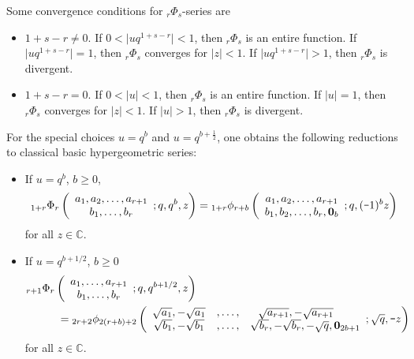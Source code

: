 \documentclass[12pt]{article}
\newcommand{\minus}{\textup{\texttt{-}}}
\newcommand{\C}{\mathbb{C}}
\begin{document}
Some convergence conditions for $_{r}\Phi_{s}$-series are
\begin{itemize}
    \item $1+s-r\neq0$. If $0<\vert uq^{1+s-r}\vert<1$, then ${}_{r}\Phi_{s}$ is an entire function. If $\vert uq^{1+s-r}\vert=1$, then ${}_{r}\Phi_{s}$ converges for $\vert z\vert<1$. If $\vert uq^{1+s-r}\vert>1$, then ${}_{r}\Phi_{s}$ is divergent.
    \item $1+s-r=0$. If $0<\vert u\vert<1$, then ${}_{r}\Phi_{s}$ is an entire function. If $\vert u\vert=1$, then ${}_{r}\Phi_{s}$ converges for $\vert z\vert<1$. If $\vert u\vert>1$, then ${}_{r}\Phi_{s}$ is divergent.
\end{itemize}
For the special choices \(u=q^b\) and \(u=q^{b+\frac12}\), one obtains the following reductions to classical basic hypergeometric series:
\begin{itemize}
    \item If $u=q^b$, $b\geq0$, 
\begin{equation}
    {}_{1+r}\Phi_{r}\left(
    \begin{array}{c}
         a_{1},a_{2},\ldots,a_{r+1}\\
         b_{1},\ldots,b_{r}
    \end{array}
    ;q,q^b,z
    \right)={}_{1+r}\phi_{r+b}\left(
    \begin{array}{c}
         a_{1},a_{2},\ldots,a_{r+1} \\
         b_{1},b_{2},\ldots,b_{r},\mathbf{0}_{b}
    \end{array}
    ;q,(\minus1)^bz
    \right)
\end{equation}
for all $z\in\C$.
\item If $u=q^{b+1/2}$, $b\geq0$
\begin{align}
    &{}_{r+1}\Phi_{r}\left(
    \begin{array}{c}
         a_{1},\ldots,a_{r+1} \\
         b_{1},\ldots,b_{r}
    \end{array}
    ;q,q^{b+1/2},z
    \right)\nonumber\\
    &\hspace{1cm}={}_{2r+2}\phi_{2(r+b)+2}\left(
    \begin{array}{ccc}
         \sqrt{a_{1}},-\sqrt{a_{1}}&,\ldots,&\sqrt{a_{r+1}},-\sqrt{a_{r+1}}\hspace{0.6cm}\\
         \sqrt{b_{1}},-\sqrt{b_{1}}&,\ldots,&\sqrt{b_{r}},-\sqrt{b_{r}},-\sqrt{q},\mathbf{0}_{2b+1}
    \end{array}
    ;\sqrt{q},\minus z
    \right)
\end{align}
for all $z\in\C$. 
\end{itemize}
\end{document}

